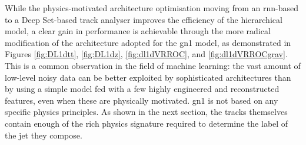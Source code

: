 While the physics-motivated architecture optimisation moving from an \gls{rnn}-based to a Deep Set-based track analyser improves the efficiency of the hierarchical model, a clear gain in performance is achievable through the more radical modification of the architecture adopted for the \gls{gn1} model, as demonstrated in Figures \ref{fig:DL1dtt}, \ref{fig:DL1dz}, \ref{fig:dl1dVRROC}, and \ref{fig:dl1dVRROCgrav}. This is a common observation in the field of machine learning: the vast amount of low-level noisy data can be better exploited by sophisticated architectures than by using a simple model fed with a few highly engineered and reconstructed features, even when these are physically motivated. \gls{gn1} is not based on any specific physics principles. As shown in the next section, the tracks themselves contain enough of the rich physics signature required to determine the label of the jet they compose. 